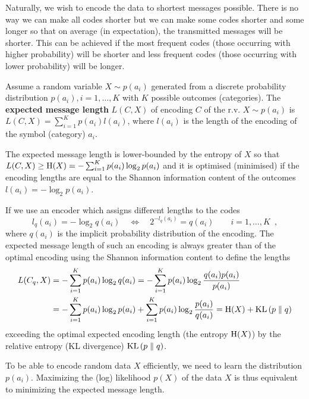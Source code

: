 Naturally, we wish to encode the data to shortest messages possible.
There is no way we can make all codes shorter but we can make some codes shorter and some longer so that on average (in expectation), the transmitted messages will be shorter.
This can be achieved if the most frequent codes (those occurring with higher probability) will be shorter and less frequent codes (those occurring with lower probability) will be longer.

\begin{definition}
Assume a random variable $X \sim p(a_i)$ generated from a discrete probability distribution $p(a_i), i=1, \ldots, K$ with $K$ possible outcomes (categories).
The \textbf{expected message length} $L(C, X)$ of encoding $C$ of the r.v. $X \sim p(a_i)$ is
$L(C, X) = \sum_{i=1}^K p(a_i) l(a_i)$, where $l(a_i)$ is the length of the encoding of the symbol (category) $a_i$.
\end{definition}

The expected message length is lower-bounded by the entropy of $X$ so that $L(C, X) \geq \mathrm{H}(X) = - \sum_{i=1}^K p(a_i) \log_2 p(a_i)$ and it is optimised (minimised) if the encoding lengths are equal to the Shannon information content of the outcomes $l(a_i) = -\log_2 p(a_i)$.

If we use an encoder which assigns different lengths to the codes
\begin{equation}
l_q(a_i) = -\log_2 q(a_i) \quad \Longleftrightarrow \quad 2^{-l_q(a_i)} = q(a_i) \qquad i=1, \ldots, K \enspace ,
\end{equation}
where $q(a_i)$ is the implicit probability distribution of the encoding.
The expected message length of such an encoding is always greater than of the optimal encoding using the Shannon information content to define the lengths
\begin{align}
L(C_q, X) & = - \sum_{i=1}^K p(a_i) \log_2 q(a_i) 
= - \sum_{i=1}^K p(a_i) \log_2 \frac{q(a_i)p(a_i)}{p(a_i)}  \nonumber \\
& = - \sum_{i=1}^K p(a_i) \log_2 p(a_i) + \sum_{i=1}^K p(a_i) \log_2 \frac{p(a_i)}{q(a_i)} 
= \mathrm{H}(X) + \operatorname*{KL} \left( p \parallel q \right)
\end{align}
exceeding the optimal expected encoding length (the entropy $\mathrm{H}(X)$) by the relative entropy (KL divergence) $\operatorname*{KL} \left( p \parallel q \right)$.


To be able to encode random data $X$ efficiently, we need to learn the distribution $p(a_i)$. Maximizing the (log) likelihood $p(X)$ of the data $X$ is thus equivalent to minimizing the expected message length.

